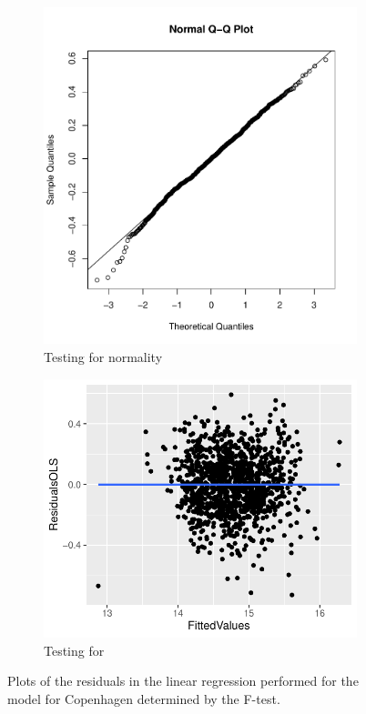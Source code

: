 \begin{figure}[H]
\centering
\begin{subfigure}[b]{0.5\textwidth}
    \centering
    \includegraphics[width = \textwidth]{figures/denheryesyeysyes.pdf}
    \caption{Testing for normality}
    \label{fig:F_chp_resu}
\end{subfigure}%
\begin{subfigure}[b]{0.5\textwidth}
\centering
    \includegraphics[width = \textwidth]{figures/RplotDenHerHejhej.pdf}
    \caption{Testing for \hetero}
    \label{fig:F_chp_hetero}
\end{subfigure}
\caption{Plots of the residuals in the linear regression performed for the model for Copenhagen determined by the F-test.}
\label{fig:F_cph_plot}
\end{figure}

